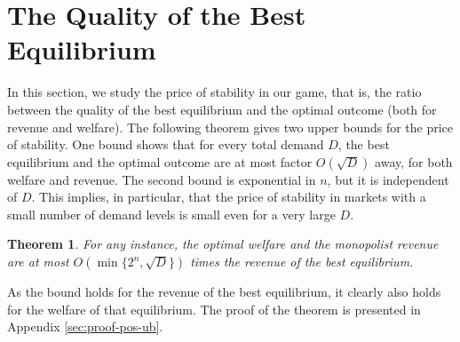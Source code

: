 \documentclass[11pt,a4paper]{article}
\newtheorem{theorem}{Theorem}[section]
\begin{document}
\section{The Quality of the Best Equilibrium}
\label{sec:pos}

In this section, we study the price of stability in our game, that is, the ratio between the quality of the best equilibrium and the optimal outcome (both for revenue and welfare).
The following theorem gives two upper bounds for the price of stability.
One bound shows that for every total demand $D$, the best equilibrium and the optimal outcome are at most factor $O(\sqrt{D})$ away, for both welfare and revenue.
The second bound is exponential in $n$, but it is independent of $D$. This implies, in particular, that the price of stability in markets with a small number of demand levels is small even for a very large $D$.

%

\begin{theorem}
	\label{thm:pos-UB}
	For any instance, the optimal welfare and the monopolist revenue are at most
	$O(\min \{2^n,\sqrt{D}\})$ times the revenue of the best equilibrium.
	
\end{theorem}
As the bound holds for the revenue of the best equilibrium, it clearly also holds for the welfare of that equilibrium.
The proof of the theorem is presented in Appendix \ref{sec:proof-pos-ub}.
\end{document}
